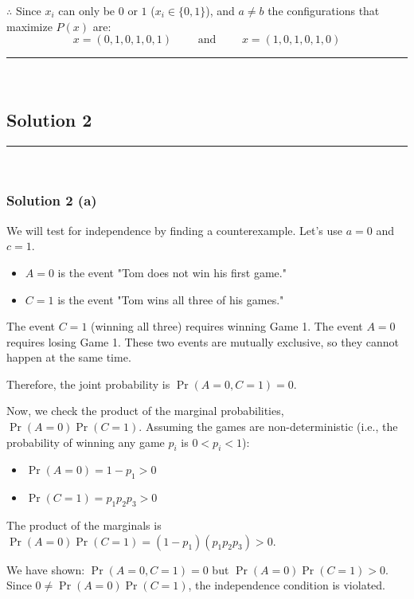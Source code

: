 \documentclass{article}
\begin{document}
\subsubsection*{\normalfont}{$\therefore$ Since $x_i$ can only be $0$ or $1$ ($x_i \in \{0,1\}$), and $a \neq b$ the configurations that maximize $P(x)$ are:}
$$x = (0, 1, 0, 1, 0, 1) \qquad \text{ and } \qquad x = (1, 0, 1, 0, 1, 0)$$

\noindent\rule{\textwidth}{0.4pt}\\

\newpage

\subsection*{Solution 2}
\noindent\rule{\textwidth}{0.4pt}\\

\subsubsection*{Solution 2 (a)}
We will test for independence by finding a counterexample. Let's use $a=0$ and $c=1$.
\begin{itemize}
    \item $A=0$ is the event "Tom does not win his first game."
    \item $C=1$ is the event "Tom wins all three of his games."
\end{itemize}
The event $C=1$ (winning all three) requires winning Game 1. The event $A=0$ requires losing Game 1. These two events are mutually exclusive, so they cannot happen at the same time.

Therefore, the joint probability is $\Pr(A=0, C=1) = 0$.

Now, we check the product of the marginal probabilities, $\Pr(A=0)\Pr(C=1)$.
Assuming the games are non-deterministic (i.e., the probability of winning any game $p_i$ is $0 < p_i < 1$):
\begin{itemize}
    \item $\Pr(A=0) = 1 - p_1 > 0$
    \item $\Pr(C=1) = p_1 p_2 p_3 > 0$
\end{itemize}
The product of the marginals is $\Pr(A=0)\Pr(C=1) = (1-p_1)(p_1 p_2 p_3) > 0$.

We have shown: $\Pr(A=0, C=1) = 0$ but $\Pr(A=0)\Pr(C=1) > 0$.
Since $0 \neq \Pr(A=0)\Pr(C=1)$, the independence condition is violated.
\end{document}
